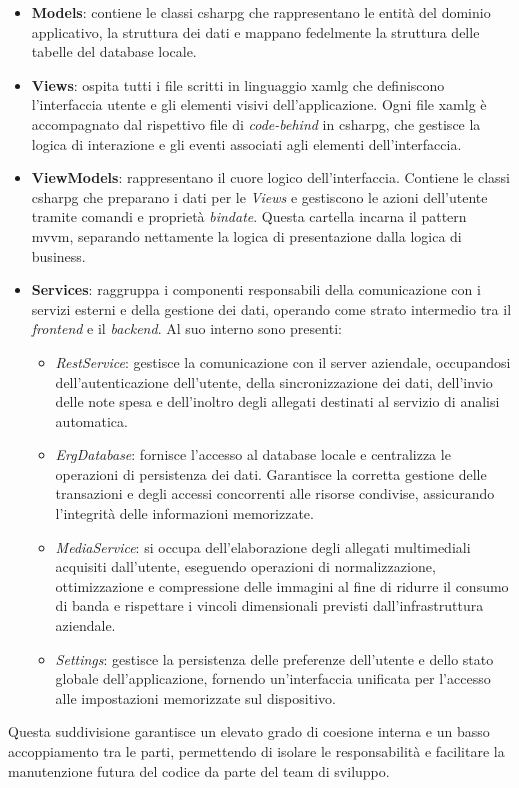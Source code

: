 \begin{itemize}
    \item \textbf{Models}: contiene le classi \gls{csharpg} che rappresentano le entità del dominio applicativo, la struttura dei dati e mappano fedelmente la struttura delle tabelle del database locale.
    \item \textbf{Views}: ospita tutti i file scritti in linguaggio \gls{xamlg} che definiscono l'interfaccia utente e gli elementi visivi dell'applicazione. Ogni file \gls{xamlg} è accompagnato dal rispettivo file di \textit{code-behind} in \gls{csharpg}, che gestisce la logica di interazione e gli eventi associati agli elementi dell'interfaccia. 
    \item \textbf{ViewModels}: rappresentano il cuore logico dell'interfaccia. Contiene le classi \gls{csharpg} che preparano i dati per le \textit{Views} e gestiscono le azioni dell'utente tramite comandi e proprietà \textit{bindate}. Questa cartella incarna il pattern \gls{mvvm}, separando nettamente la logica di presentazione dalla logica di business.
    \item \textbf{Services}: raggruppa i componenti responsabili della comunicazione con i servizi esterni e della gestione dei dati, operando come strato intermedio tra il \textit{frontend} e il \textit{backend}. Al suo interno sono presenti: 
    \begin{itemize}
        \item \textit{RestService}: gestisce la comunicazione con il server aziendale, occupandosi dell'autenticazione dell'utente, della sincronizzazione dei dati, dell'invio delle note spesa e dell'inoltro degli allegati destinati al servizio di analisi automatica.
        \item \textit{ErgDatabase}: fornisce l'accesso al database locale e centralizza le operazioni di persistenza dei dati. Garantisce la corretta gestione delle transazioni e degli accessi concorrenti alle risorse condivise, assicurando l'integrità delle informazioni memorizzate.
        \item \textit{MediaService}: si occupa dell'elaborazione degli allegati multimediali acquisiti dall'utente, eseguendo operazioni di normalizzazione, ottimizzazione e compressione delle immagini al fine di ridurre il consumo di banda e rispettare i vincoli dimensionali previsti dall'infrastruttura aziendale.
        \item \textit{Settings}: gestisce la persistenza delle preferenze dell'utente e dello stato globale dell'applicazione, fornendo un'interfaccia unificata per l'accesso alle impostazioni memorizzate sul dispositivo.
    \end{itemize}
\end{itemize}
Questa suddivisione garantisce un elevato grado di coesione interna e un basso accoppiamento tra le parti, permettendo di isolare le responsabilità e facilitare la manutenzione futura del codice da parte del team di sviluppo.


